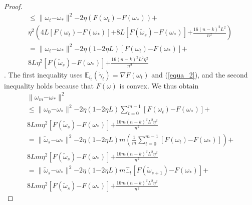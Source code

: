 \documentclass[letterpaper]{article}
\begin{document}
\begin{proof}
\begin{equation}
\begin{array}{ll}
\le \parallel  \omega_{t}\mathrm{-}\omega_\ast  \parallel^2  \mathrm{-}2\eta( F(\omega_t) \mathrm{-} F(\omega_\ast) ) \mathrm{+} \\
\eta^2 \left(  4L [F(\omega_t)\mathrm{-}F(\omega_\ast)] \mathrm{+} 8L [F(\tilde{\omega}_s)\mathrm{-}F(\omega_\ast)] \mathrm{+} \frac{16(n-k)^2L^2}{n^2}\right)  \\ 
= \parallel  \omega_{t}\mathrm{-}\omega_\ast  \parallel^2  \mathrm{-}2\eta(1\mathrm{-}2\eta L) [F(\omega_t) \mathrm{-} F(\omega_\ast) ] \mathrm{+} \\
8L \eta^2 [F(\tilde{\omega}_s)\mathrm{-}F(\omega_\ast)] \mathrm{+} \frac{16(n-k)^2L^2\eta^2}{n^2}
\end{array} 
\end{equation}. The first inequality uses $\mathbb{E}_{i_t}(\dot{\gamma}_t) \mathrm{=} \nabla F(\omega_t)$ and (\ref{equa_2}), and the second inequality holds because that $F(\omega)$ is convex.  We thus obtain 
\begin{equation}
\begin{array}{ll}
\parallel  \omega_{m}\mathrm{-}\omega_\ast \parallel^2\\
\le \parallel  \omega_{0}\mathrm{-}\omega_\ast  \parallel^2  \mathrm{-}2\eta(1\mathrm{-}2\eta L)\sum\limits_{t=0}^{m-1} [F(\omega_t) \mathrm{-} F(\omega_\ast) ] \mathrm{+} \\
8Lm \eta^2 [F(\tilde{\omega}_s)\mathrm{-}F(\omega_\ast)] \mathrm{+}\frac{16m(n-k)^2L^2\eta^2}{n^2} \\
=\parallel  \tilde{\omega}_{s}\mathrm{-}\omega_\ast  \parallel^2  \mathrm{-}2\eta(1\mathrm{-}2\eta L)m \left(\frac{1}{m}\sum\limits_{t=0}^{m-1} [F(\omega_t) \mathrm{-} F(\omega_\ast) ] \right)\mathrm{+} \\
8Lm \eta^2 [F(\tilde{\omega}_s)\mathrm{-}F(\omega_\ast)] \mathrm{+} \frac{16m(n-k)^2L^2\eta^2}{n^2}\\
= \parallel  \tilde{\omega}_{s}\mathrm{-}\omega_\ast  \parallel^2  \mathrm{-}2\eta(1\mathrm{-}2\eta L)m \mathbb{E}_t[F(\tilde{\omega}_{s+1}) \mathrm{-} F(\omega_\ast) ] \mathrm{+} \\
8Lm \eta^2 [F(\tilde{\omega}_s)\mathrm{-}F(\omega_\ast)] \mathrm{+}\frac{16m(n-k)^2L^2\eta^2}{n^2}

\end{array}
\end{equation}
\end{proof}
\end{document}
